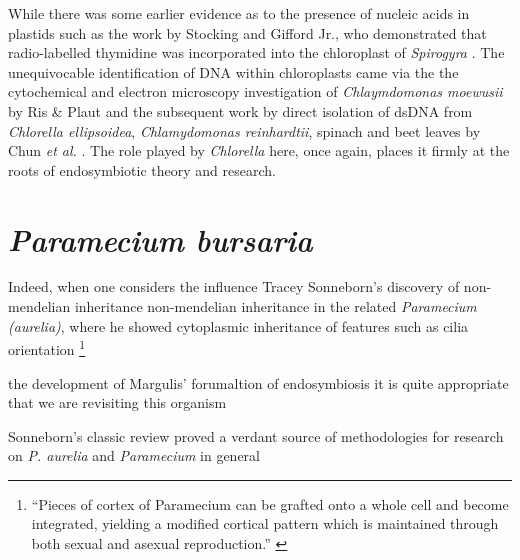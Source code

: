 While there was some earlier evidence as to the presence of nucleic acids in 
plastids such as the work by Stocking and Gifford Jr., who demonstrated that
radio-labelled thymidine was incorporated into the chloroplast of \textit{Spirogyra}
\citep{Stocking1959}.
The unequivocable identification of DNA within chloroplasts came via the 
the cytochemical and electron microscopy investigation of \textit{Chlaymdomonas moewusii} 
by Ris \& Plaut \citep{Ris1962} and the subsequent work by direct isolation of
dsDNA from \textit{Chlorella ellipsoidea}, \textit{Chlamydomonas reinhardtii}, spinach
and beet leaves by Chun \textit{et al.} \citep{Chun1963}. The role played by
\textit{Chlorella} here, once again, places it firmly at the roots of endosymbiotic
theory and research.



\section{\textit{Paramecium bursaria}}

\citep{Corliss1974} 




Indeed, when one considers the influence Tracey Sonneborn's discovery of non-mendelian
inheritance non-mendelian inheritance in the related \textit{Paramecium (aurelia)}, where he showed
cytoplasmic inheritance of features such as cilia orientation \footnote{``Pieces of cortex of Paramecium can be grafted onto a whole cell and
    become integrated, yielding a modified cortical pattern which is maintained through both sexual and asexual reproduction.'' \citep{Beisson1965}}

the development of Margulis' forumaltion of endosymbiosis \citep{Margulis1998} it is
quite appropriate that we are revisiting this organism

Sonneborn's classic review \citep{Sonneborn1950} proved a verdant source of methodologies
for research on  \textit{P. aurelia} and \textit{Paramecium} in general

